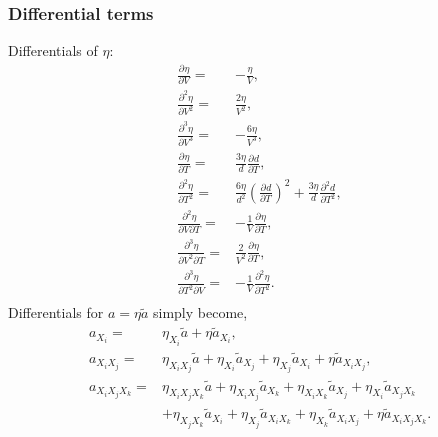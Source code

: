 \documentclass[english]{../thermomemo/thermomemo}
\newcommand*{\pd}[3][]{\frac{\partial^{#1}#2}{\partial{#3}^{#1}}}%
\newcommand*{\pdc}[3]{\frac{\partial^{2}#1}{\partial{#2}\partial{#3}}}%
\newcommand*{\pdcc}[3]{\frac{\partial^{3}#1}{\partial{#2}^{2}\partial{#3}}}%
\newcommand*{\lb}{\left(}
\newcommand*{\rb}{\right)}
\newcommand{\at}{\ensuremath{\tilde{a}}\xspace}
\begin{document}
\subsubsection{Differential terms}
Differentials of $\eta$:
\begin{align}
  \label{eq:eta_diff}
  \pd{\eta}{V} =& -\frac{\eta}{V},\\
  \pd[2]{\eta}{V} =& \frac{2\eta}{V^2},\\
  \pd[3]{\eta}{V} =& -\frac{6\eta}{V^3},\\
  \pd{\eta}{T} =& \frac{3\eta}{d}\pd{d}{T},\\
  \pd[2]{\eta}{T} =& \frac{6\eta}{d^2}\lb\pd{d}{T}\rb^2 + \frac{3\eta}{d}\pd[2]{d}{T},\\
  \pdc{\eta}{V}{T} =& -\frac{1}{V}\pd{\eta}{T}, \\
  \pdcc{\eta}{V}{T} =& \frac{2}{V^2}\pd{\eta}{T}, \\
  \pdcc{\eta}{T}{V} =& -\frac{1}{V}\pd[2]{\eta}{T}. \\
\end{align}
Differentials for $a = \eta \at$ simply become,
\begin{align}
  a_{X_i} =& \eta_{X_i} \at + \eta \at_{X_i},\\
  a_{X_i X_j} =& \eta_{X_i X_j} \at + \eta_{X_i} \at_{X_j} + \eta_{X_j} \at_{X_i} + \eta \at_{X_i X_j},\\
  a_{X_i X_j X_k} =& \eta_{X_i X_j X_k} \at + \eta_{X_i X_j} \at_{X_k} + \eta_{X_i X_k} \at_{X_j} + \eta_{X_i} \at_{X_j X_k} \nonumber \\ & + \eta_{X_j X_k} \at_{X_i} + \eta_{X_j} \at_{X_i X_k} + \eta_{X_k} \at_{X_i X_j} + \eta \at_{X_i X_j X_k}.
\end{align}
\end{document}
